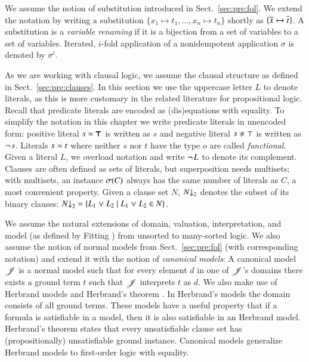 We assume the notion of substitution introduced in Sect.~\ref{sec:pre:fol}.
We extend the notation by writing a substitution $\{x_1 \mapsto t_1,
\ldots,\allowbreak x_n \mapsto t_n\}$ shortly as $\{ \overline{x}_{} \mapsto \overline{t}_{} \}$.
A substitution is a \emph{variable renaming} if it is a
bijection from a set of variables to a set of variables. Iterated, $i$-fold application 
of a nonidempotent application $\sigma$ is denoted by $\sigma^i$.


As we are working with clausal logic, we assume the clausal structure as defined
in Sect.~\ref{sec:pre:clauses}. In this section we use the uppercase letter $L$
to denote literals, as this is more customary in the related literature for
propositional logic. Recall that predicate literals  are encoded as
(dis)equations with equality. To simplify the notation in this chapter we write
predicate literals in unencoded form: positive literal $s \approx \pmb{\top}$ is
written as $s$ and negative literal $\neqlit{s}{\top}$ is written as
$\neg{\kern.2ex s}$. Literals $s \approx t$ where neither $s$ nor $t$ have the
type $o$ are called \emph{functional}. Given a literal $L$, we overload notation
and write $\neg{\kern.2ex L}$ to denote its complement. Clauses are often defined as
sets of literals, but superposition needs multisets; with multisets, an instance
$\sigma(C)$ always has the same number of literals as $C$, a most convenient
property. Given a clause set $N$, $N{\downarrow}_2$ denotes the subset of its binary
clauses: $N{\downarrow}_2 = \{ L_1 \mathrel{\lor} L_2 \mid L_1 \mathrel{\lor} L_2 \in N \}$.

We assume the natural extensions of domain, valuation, interpretation, and model
(as defined by Fitting \cite{mf-1996-fol}) from unsorted to many-sorted logic.
We also assume the notion of normal models from Sect.~\ref{sec:pre:fol} (with
corresponding notation) and extend it with the notion of \emph{canonical
models}: A canonical model $\mathscr{J}$ is a normal model such that for every
element $d$ in one of $\mathscr{J}$'s domains there exists a ground term $t$ such
that $\mathscr{J}$ interprets $t$ as $d$. 
We also make use of Herbrand models and Herbrand's theorem \cite[Sect.~5.4]{mf-1996-fol}.
In Herbrand's models the domain consists of all ground terms. These models have a 
useful property that if a formula is satisfiable in a model, then it is also satisfiable in an
Herbrand model. Herbrand's theorem states that every unsatisfiable clause set has (propositionally)
unsatisfiable ground instance.     
Canonical models generalize Herbrand models to first-order logic with equality.

